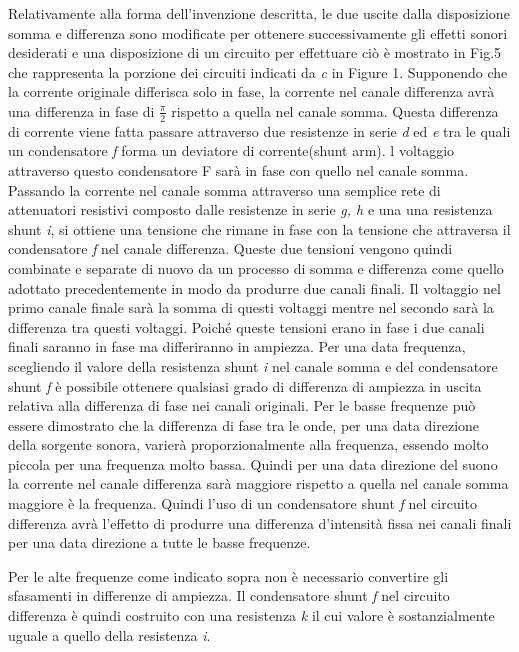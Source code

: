 \documentclass[11pt]{article}
\begin{document}
\begin{multicols*}{2}
Relativamente alla forma dell’invenzione descritta, le due uscite dalla disposizione somma e differenza sono modificate per ottenere successivamente gli effetti sonori desiderati e una disposizione di un circuito per effettuare ciò è mostrato in Fig.5 che rappresenta la porzione dei circuiti indicati da \textit{c} in Figure 1. Supponendo che la corrente originale differisca solo in fase, la corrente nel canale differenza avrà una differenza in fase di  $\frac{\pi}{2}$ rispetto a quella nel canale somma. Questa differenza di corrente viene fatta passare attraverso due resistenze in serie \textit{d} ed \textit{e} tra le quali un condensatore \textit{f} forma un deviatore di corrente(shunt arm). l voltaggio attraverso questo condensatore F sarà in fase con quello nel canale somma. Passando la corrente nel canale somma attraverso una semplice rete di attenuatori resistivi composto dalle resistenze in serie \textit{g, h} e una una resistenza shunt \textit{i}, si ottiene una tensione che rimane in fase con la tensione che attraversa il condensatore \textit{f} nel canale differenza. Queste due tensioni vengono quindi combinate e separate di nuovo da un processo di somma e differenza come quello adottato precedentemente in modo da produrre due canali finali. Il voltaggio nel primo canale finale sarà la somma di questi voltaggi mentre nel secondo sarà la differenza tra questi voltaggi. Poiché queste tensioni erano in fase i due canali finali saranno in fase ma differiranno in ampiezza. Per una data frequenza, scegliendo il valore della resistenza shunt \textit{i} nel canale somma e del condensatore shunt \textit{f} è possibile ottenere qualsiasi grado di differenza di ampiezza in uscita relativa alla differenza di fase nei canali originali. Per le basse frequenze può essere dimostrato che la differenza di fase tra le onde, per una data direzione della sorgente sonora, varierà proporzionalmente alla frequenza, essendo molto piccola per una frequenza molto bassa. Quindi per una data direzione del suono la corrente nel canale differenza sarà maggiore rispetto a quella nel canale somma maggiore è la frequenza. Quindi l’uso di un condensatore shunt \textit{f} nel circuito differenza avrà l’effetto di produrre una differenza d’intensità fissa nei canali finali per una data direzione a tutte le basse frequenze.

Per le alte frequenze come indicato sopra non è necessario convertire gli sfasamenti in differenze di ampiezza. Il condensatore shunt \textit{f} nel circuito differenza è quindi costruito con una resistenza \textit{k} il cui valore è sostanzialmente uguale a quello della resistenza \textit{i}. 


\end{multicols*}
\end{document}
